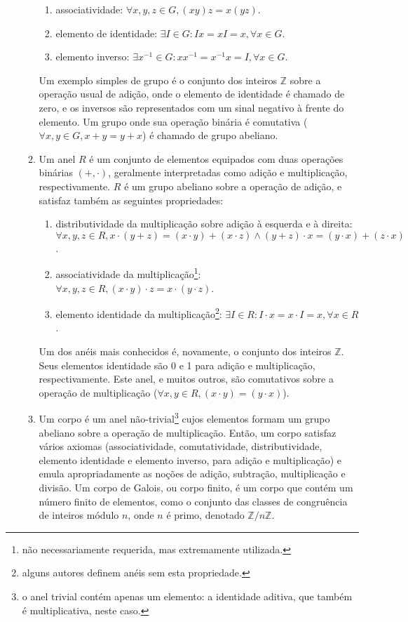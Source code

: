\documentclass[fleqn]{article}
\begin{document}
\begin{enumerate}[label=\textbf{\arabic*})]
\begin{enumerate}
\begin{enumerate}
\item associatividade: $\forall x, y, z \in G, (x y) z = x (y z)$.
\item elemento de identidade: $\exists I \in G : Ix = xI = x,
\forall x \in G$.
\item elemento inverso: $\exists x^{-1} \in G : x x^{-1} = x^{-1} x = I,
\forall x \in G$.

\end{enumerate}

Um exemplo simples de grupo é o conjunto dos inteiros $\mathbb{Z}$ sobre a
operação usual de adição, onde o elemento de identidade é chamado de zero, e
os inversos são representados com um sinal negativo à frente do elemento. Um
grupo onde sua operação binária é comutativa
($\forall x, y \in G, x + y = y + x$) é chamado de grupo abeliano.

\item Um anel $R$ é um conjunto de elementos equipados com duas operações
binárias $(+, \cdot)$, geralmente interpretadas como adição e multiplicação,
respectivamente. $R$ é um grupo abeliano sobre a operação de adição, e
satisfaz também as seguintes propriedades:

\begin{enumerate}

\item distributividade da multiplicação sobre adição à esquerda e à direita:
$\forall x, y, z \in R, x \cdot (y + z) = (x \cdot y) + (x \cdot z)
\land (y + z) \cdot x = (y \cdot x) + (z \cdot x)$.
\item associatividade da multiplicação\footnote{não necessariamente requerida,
mas extremamente utilizada.}: $\forall x, y, z \in R, (x \cdot y) \cdot z
= x \cdot (y \cdot z)$.
\item elemento identidade da multiplicação\footnote{alguns autores definem
anéis sem esta propriedade.}: $\exists I \in R : I \cdot x = x \cdot I = x,
\forall x \in R$.

\end{enumerate}

Um dos anéis mais conhecidos é, novamente, o conjunto dos inteiros
$\mathbb{Z}$. Seus elementos identidade são 0 e 1 para adição e multiplicação,
respectivamente. Este anel, e muitos outros, são comutativos sobre a operação
de multiplicação ($\forall x, y \in R, (x \cdot y) = (y \cdot x)$).

\item Um corpo é um anel não-trivial\footnote{o anel trivial contém apenas um
elemento: a identidade aditiva, que também é multiplicativa, neste caso.}
cujos elementos formam um grupo abeliano sobre a operação de multiplicação.
Então, um corpo satisfaz vários axiomas (associatividade, comutatividade,
distributividade, elemento identidade e elemento inverso, para adição e
multiplicação) e emula apropriadamente as noções de adição, subtração,
multiplicação e divisão. Um corpo de Galois, ou corpo finito, é um corpo que
contém um número finito de elementos, como o conjunto das classes de
congruência de inteiros módulo $n$, onde $n$ é primo, denotado
$\mathbb{Z}/n\mathbb{Z}$.


\end{enumerate}
\end{enumerate}
\end{document}
